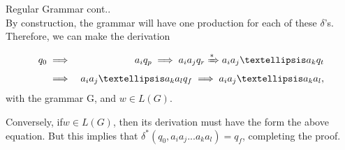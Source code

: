 \documentclass{beamer}
\begin{document}
\begin{frame}{Regular Grammar}
	\proofname cont.. \\
	By construction, the grammar will have one production for each of these $\delta$’s.
	Therefore, we can make the derivation

	\begin{eqnarray*}
		q_0 &\implies& a_iq_p \implies a_ia_jq_r \xRightarrow{*} a_ia_j… a_kq_t\\
		&\implies& a_ia_j… a_ka_lq_f \implies a_ia_j… a_ka_l,
	\end{eqnarray*}
with the grammar G, and $w \in L(G)$.
\par Conversely, if$ w \in L(G)$, then its derivation must have the form the above equation. But this
implies that $\delta^* (q_0, a_ia_j...a_ka_l) = q_f$, completing the proof.
\end{frame}		
\end{document}
